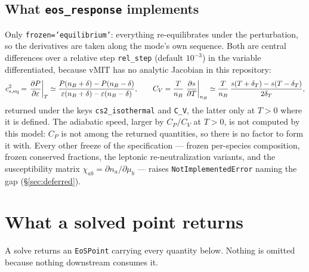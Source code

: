 \documentclass[aps,prc,onecolumn,superscriptaddress,nofootinbib,10pt]{revtex4-2}
\newcommand{\nB}{n_B}
\begin{document}
\subsection{What \texttt{eos\_response} implements}

Only \texttt{frozen='equilibrium'}: everything re-equilibrates under the
perturbation, so the derivatives are taken along the mode's own sequence. Both
are central differences over a relative step \texttt{rel\_step} (default
$10^{-3}$) in the variable differentiated, because vMIT has no analytic
Jacobian in this repository:
%
\begin{equation}
c_{s,\rm eq}^2 = \left.\frac{\partial P}{\partial \varepsilon}\right|_{T}
   \simeq \frac{P(\nB + \delta) - P(\nB - \delta)}
               {\varepsilon(\nB + \delta) - \varepsilon(\nB - \delta)} ,
\qquad
C_V = \frac{T}{\nB} \left.\frac{\partial s}{\partial T}\right|_{\nB}
   \simeq \frac{T}{\nB}\,
     \frac{s(T + \delta_T) - s(T - \delta_T)}{2\delta_T} ,
\label{eq:response}
\end{equation}
%
returned under the keys \texttt{cs2\_isothermal} and \texttt{C\_V}, the
latter only at $T > 0$ where it is defined. The adiabatic speed, larger by
$C_P/C_V$ at $T > 0$, is not computed by this model: $C_P$ is not among the
returned quantities, so there is no factor to form it with. Every other freeze of the specification --- frozen
per-species composition, frozen conserved fractions, the leptonic
re-neutralization variants, and the susceptibility matrix
$\chi_{ab} = \partial n_a / \partial \mu_b$ --- raises
\texttt{NotImplementedError} naming the gap (\S\ref{sec:deferred}).

\section{What a solved point returns}
\label{sec:returns}

A solve returns an \texttt{EoSPoint} carrying every quantity below. Nothing is
omitted because nothing downstream consumes it.
\end{document}
